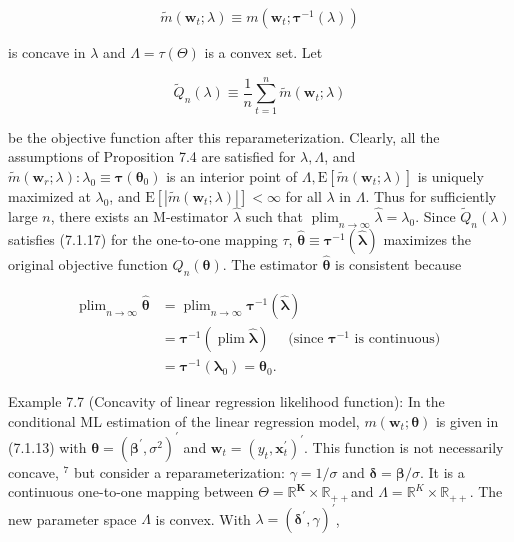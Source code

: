 \documentclass[10pt]{article}
\begin{document}
$$
\widetilde{m}\left(\mathbf{w}_{t} ; \lambda\right) \equiv m\left(\mathbf{w}_{t} ; \boldsymbol{\tau}^{-1}(\lambda)\right)
$$

is concave in $\lambda$ and $\Lambda=\tau(\Theta)$ is a convex set. Let

$$
\widetilde{Q}_{n}(\lambda) \equiv \frac{1}{n} \sum_{t=1}^{n} \widetilde{m}\left(\mathbf{w}_{t} ; \lambda\right)
$$

be the objective function after this reparameterization. Clearly, all the assumptions of Proposition 7.4 are satisfied for $\lambda, \Lambda$, and $\tilde{m}\left(\mathbf{w}_{r} ; \lambda\right): \lambda_{0} \equiv \boldsymbol{\tau}\left(\boldsymbol{\theta}_{0}\right)$ is an interior point of $\Lambda, \mathrm{E}\left[\widetilde{m}\left(\mathbf{w}_{t} ; \lambda\right)\right]$ is uniquely maximized at $\lambda_{0}$, and $\mathrm{E}\left[\left|\widetilde{m}\left(\mathbf{w}_{t} ; \lambda\right)\right|\right]<\infty$ for all $\lambda$ in $\Lambda$. Thus for sufficiently large $n$, there exists an M-estimator $\hat{\lambda}$ such that $\operatorname{plim}_{n \rightarrow \infty} \hat{\lambda}=\lambda_{0}$. Since $\widetilde{Q}_{n}(\lambda)$ satisfies (7.1.17) for the one-to-one mapping $\tau$, $\hat{\boldsymbol{\theta}} \equiv \boldsymbol{\tau}^{-1}(\hat{\boldsymbol{\lambda}})$ maximizes the original objective function $Q_{n}(\boldsymbol{\theta})$. The estimator $\hat{\boldsymbol{\theta}}$ is consistent because


\begin{align*}
\operatorname{plim}_{n \rightarrow \infty} \hat{\boldsymbol{\theta}} & =\operatorname{plim}_{n \rightarrow \infty} \boldsymbol{\tau}^{-1}(\hat{\boldsymbol{\lambda}}) \\
& =\boldsymbol{\tau}^{-1}(\operatorname{plim} \hat{\boldsymbol{\lambda}}) \quad \text { (since } \boldsymbol{\tau}^{-1} \text { is continuous) } \\
& =\boldsymbol{\tau}^{-1}\left(\boldsymbol{\lambda}_{0}\right)=\boldsymbol{\theta}_{0} . \tag{7.2.6}
\end{align*}


Example 7.7 (Concavity of linear regression likelihood function): In the conditional ML estimation of the linear regression model, $m\left(\mathbf{w}_{t} ; \boldsymbol{\theta}\right)$ is given in (7.1.13) with $\boldsymbol{\theta}=\left(\boldsymbol{\beta}^{\prime}, \sigma^{2}\right)^{\prime}$ and $\mathbf{w}_{t}=\left(y_{t}, \mathbf{x}_{t}^{\prime}\right)^{\prime}$. This function is not necessarily concave, ${ }^{7}$ but consider a reparameterization: $\gamma=1 / \sigma$ and $\boldsymbol{\delta}=\boldsymbol{\beta} / \sigma$. It is a continuous one-to-one mapping between $\Theta=\mathbb{R}^{\boldsymbol{K}} \times \mathbb{R}_{++}$and $\Lambda=\mathbb{R}^{K} \times \mathbb{R}_{++}$. The new parameter space $\Lambda$ is convex. With $\lambda=\left(\boldsymbol{\delta}^{\prime}, \gamma\right)^{\prime}$,
\end{document}
